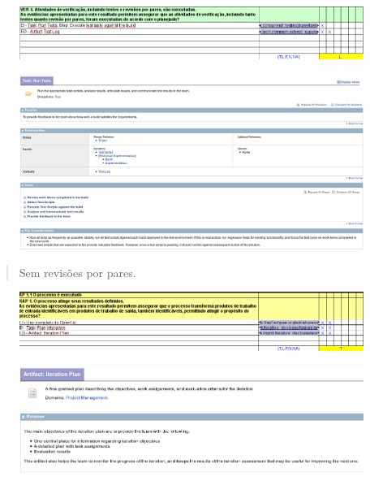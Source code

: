 \begin{frame}
\begin{figure}[p]
    \centering
    \includegraphics[width=\textwidth]{conteudo/VER4-run_tests}
    \label{fig:Pattern}
\end{figure}	
\end{frame}
\begin{frame}
\begin{figure}[p]
    \centering
    \includegraphics[width=\textwidth]{conteudo/task-run_tests}
    \label{fig:Pattern}
\end{figure}	
\begin{quote}
Sem revisões por pares.
\end{quote}
\end{frame}


\begin{frame}
\begin{figure}[p]
    \centering
    \includegraphics[width=\textwidth]{conteudo/RAP1}
    \label{fig:Pattern}
\end{figure}	
\end{frame}
\begin{frame}
\begin{figure}[p]
    \centering
    \includegraphics[width=\textwidth]{conteudo/plan}
    \label{fig:Pattern}
\end{figure}	
\begin{quote}
\end{quote}
\end{frame}

